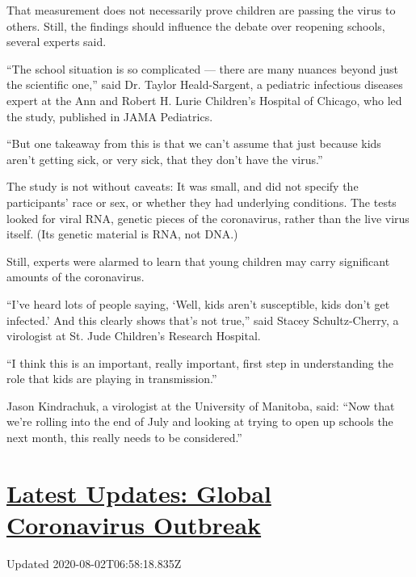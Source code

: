That measurement does not necessarily prove children are passing the
virus to others. Still, the findings should influence the debate over
reopening schools, several experts said.

``The school situation is so complicated --- there are many nuances
beyond just the scientific one,'' said Dr. Taylor Heald-Sargent, a
pediatric infectious diseases expert at the Ann and Robert H. Lurie
Children's Hospital of Chicago, who led the study, published in JAMA
Pediatrics.

``But one takeaway from this is that we can't assume that just because
kids aren't getting sick, or very sick, that they don't have the
virus.''

The study is not without caveats: It was small, and did not specify the
participants' race or sex, or whether they had underlying conditions.
The tests looked for viral RNA, genetic pieces of the coronavirus,
rather than the live virus itself. (Its genetic material is RNA, not
DNA.)

Still, experts were alarmed to learn that young children may carry
significant amounts of the coronavirus.

``I've heard lots of people saying, `Well, kids aren't susceptible, kids
don't get infected.' And this clearly shows that's not true,'' said
Stacey Schultz-Cherry, a virologist at St. Jude Children's Research
Hospital.

``I think this is an important, really important, first step in
understanding the role that kids are playing in transmission.''

Jason Kindrachuk, a virologist at the University of Manitoba, said:
``Now that we're rolling into the end of July and looking at trying to
open up schools the next month, this really needs to be considered.''

\hypertarget{latest-updates-global-coronavirus-outbreak}{%
\section{\texorpdfstring{\href{https://www.nytimes.com/2020/08/01/world/coronavirus-covid-19.html?action=click\&pgtype=Article\&state=default\&region=MAIN_CONTENT_1\&context=storylines_live_updates}{Latest
Updates: Global Coronavirus
Outbreak}}{Latest Updates: Global Coronavirus Outbreak}}\label{latest-updates-global-coronavirus-outbreak}}

Updated 2020-08-02T06:58:18.835Z


